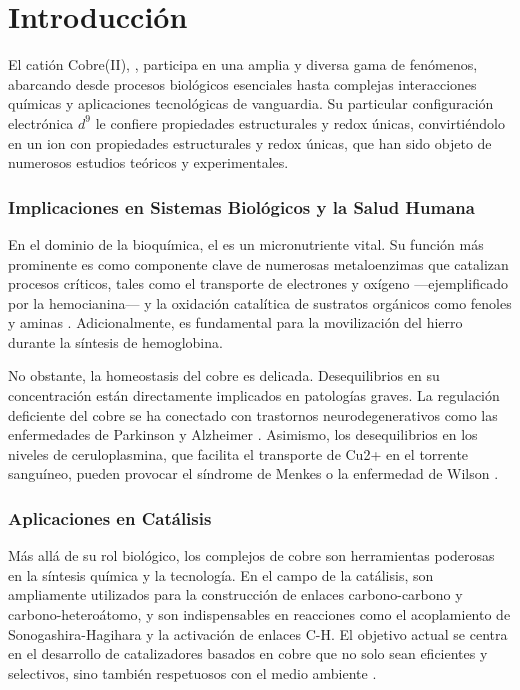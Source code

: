 \chapter{Introducción}

El catión Cobre(II), , participa en una amplia y diversa gama de fenómenos, abarcando desde procesos biológicos esenciales hasta complejas interacciones químicas y aplicaciones tecnológicas de vanguardia. Su particular configuración electrónica $d^9$ le confiere propiedades estructurales y redox únicas, convirtiéndolo en un ion con propiedades estructurales y redox únicas, que han sido objeto de numerosos estudios teóricos y experimentales.

\subsection*{Implicaciones en Sistemas Biológicos y la Salud Humana}

En el dominio de la bioquímica, el  es un micronutriente vital. Su función más prominente es como componente clave de numerosas metaloenzimas que catalizan procesos críticos, tales como el transporte de electrones y oxígeno —ejemplificado por la hemocianina— y la oxidación catalítica de sustratos orgánicos como fenoles y aminas \cite{Cu-2014-01, Wa-2024-03, Wa-2017-01, Wa-2009-01}. Adicionalmente, es fundamental para la movilización del hierro durante la síntesis de hemoglobina.

No obstante, la homeostasis del cobre es delicada. Desequilibrios en su concentración están directamente implicados en patologías graves. La regulación deficiente del cobre se ha conectado con trastornos neurodegenerativos como las enfermedades de Parkinson y Alzheimer \cite{Cu-2014-02,Cu-2011-02, Cu-2012-01}. Asimismo, los desequilibrios en los niveles de ceruloplasmina, que facilita el transporte de Cu2+ en el torrente sanguíneo, pueden provocar el síndrome de Menkes o la enfermedad de Wilson \cite{Cu-2001-01, Cu-2017-01}.

\subsection*{Aplicaciones en Catálisis}

Más allá de su rol biológico, los complejos de cobre son herramientas poderosas en la síntesis química y la tecnología. En el campo de la catálisis, son ampliamente utilizados para la construcción de enlaces carbono-carbono y carbono-heteroátomo, y son indispensables en reacciones como el acoplamiento de Sonogashira-Hagihara y la activación de enlaces C-H. El objetivo actual se centra en el desarrollo de catalizadores basados en cobre que no solo sean eficientes y selectivos, sino también respetuosos con el medio ambiente \cite{Cu-2014-01}.

